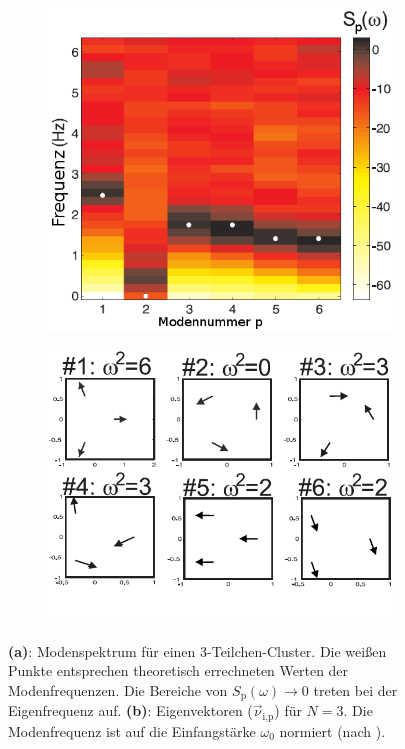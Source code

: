 \documentclass[numbers=noenddot,a4paper]{scrartcl}
\newcommand{\ix}[1]{_\text{#1}}
\newcommand{\fett}[1]{\textbf{#1}}
\begin{document}
						\begin{figure}
							\centering
							\begin{subfigure}[b]{0.48\textwidth}
								\centering
								\includegraphics[width=\textwidth,height=0.3\textheight]{figs/modenvenergie3teilchenmelzer.png}
								\caption{}
								\label{img:spektrum}
							\end{subfigure}
							\begin{subfigure}[b]{0.48\textwidth}
								\centering
								\includegraphics[width=\textwidth,height=0.3\textheight]{figs/modenvektoren3teilchenmelzer.png}
								\caption{}
								\label{img:moden}
							\end{subfigure}
							\caption{\fett{(a)}: Modenspektrum für einen 3-Teilchen-Cluster. Die weißen Punkte entsprechen theoretisch errechneten Werten der Modenfrequenzen. Die Bereiche von $S\ix{p}\left(\omega\right)\rightarrow0$ treten bei der Eigenfrequenz auf. \fett{(b)}: Eigenvektoren ($\vec{\nu}\ix{i,p}$) für $N=3$. Die Modenfrequenz ist auf die Einfangstärke $\omega\ix{0}$ normiert (nach \cite{Melzer12}).}
						\end{figure}
\end{document}
